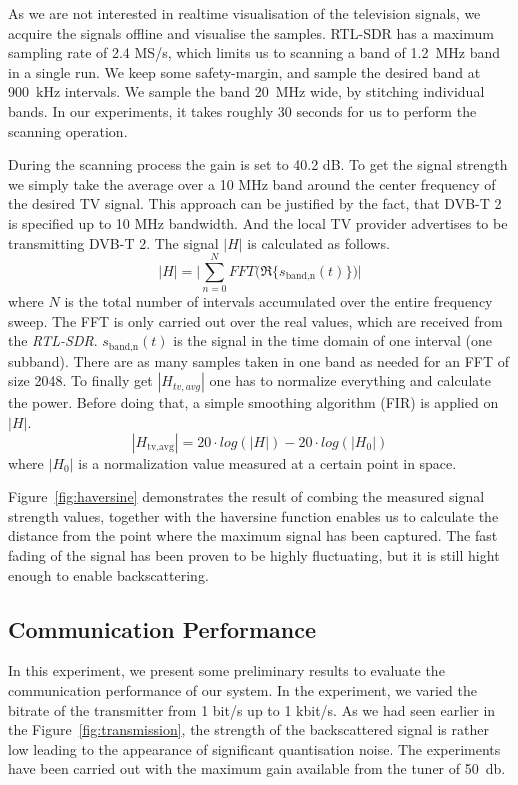 As we are not interested in realtime visualisation of the television
signals, we acquire the signals offline and visualise the samples.
RTL-SDR has a maximum sampling rate of 2.4 MS/s, which limits us to
scanning a band of \SI{1.2}{\mega\hertz} band in a single run. We  keep some safety-margin, and
sample the desired band at \SI{900}{\kilo\hertz} intervals. We sample the band 
\SI{20}{\mega\hertz} wide, by stitching individual bands. In our experiments, it takes roughly 30
seconds for us to perform the scanning operation.


 
During the scanning process the gain is set to 40.2 dB. To get the
signal strength we simply take the average over a 10 MHz band around the
center frequency of the desired TV signal. This approach can be
justified by the fact, that DVB-T 2 is specified up to 10 MHz bandwidth.
And the local TV provider advertises to be transmitting DVB-T 2.
The signal \ensuremath{|H|} is calculated as follows.  
\begin{equation}
	|H| = \Biggl| \sum_{n=0}^N FFT\biggl( \Re\{ s_{\text{band,n}}(t) \} \biggr) \Biggr|
\end{equation}     where \ensuremath{N} is the total number of intervals
accumulated over the entire frequency sweep. The FFT is only carried out over
the real values, which are received from the \textit{RTL-SDR}.
\ensuremath{s_{\text{band,n}}(t)} is the signal in the time domain of one
interval (one subband). There are as many samples taken in one band as needed
for an FFT of size 2048. To finally get \ensuremath{|H_{tv,avg}|} one has to
normalize everything and calculate the power. Before doing that, a simple
smoothing algorithm (FIR) is applied on \ensuremath{|H|}.  
\begin{equation}
	|H_{\text{tv,avg}}| = 20 \cdot log (|H|) - 20 \cdot log(|H_0|)
\end{equation}   
where \ensuremath{|H_0|} is a normalization value measured at a certain point
in space. 

Figure~\ref{fig:haversine} demonstrates the result of combing the measured
signal strength values, together with the haversine function enables us to
calculate the distance from the point where the maximum signal has been
captured. The fast fading of the signal has been proven to be highly fluctuating, but it is still hight enough to enable backscattering.    

\balance

\subsection{Communication Performance}
In this experiment, we present some preliminary results to evaluate the communication
performance of our system.  In the experiment, we varied the bitrate of the transmitter
from 1 bit/s up to 1 kbit/s. As we had seen earlier in the Figure~\ref{fig:transmission}, the strength
of the backscattered signal is rather low leading to the appearance of significant quantisation noise.
The experiments have been carried out with the maximum gain available from the tuner of \SI{50}{\decibel}.

